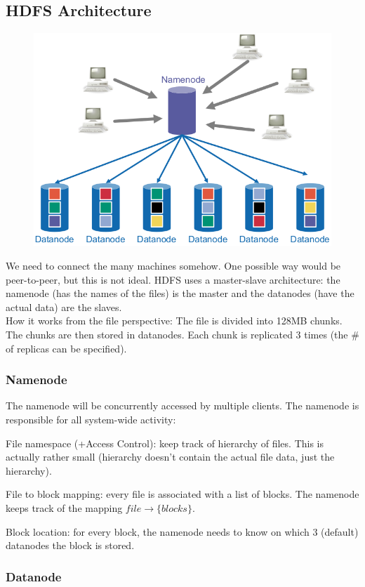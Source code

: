 \documentclass[11pt,oneside,a4paper]{article}
\begin{document}
\subsection{HDFS Architecture}

\begin{figure}[hb!]
	\centering
	\includegraphics[width=0.3\linewidth]{figures/hdfs_architecture}
	\label{fig:hdfsarchitecture}
\end{figure}


We need to connect the many machines somehow. One possible way would be peer-to-peer, but this is not ideal. HDFS uses a master-slave architecture: the namenode (has the names of the files) is the master and the datanodes (have the actual data) are the slaves.\\
How it works from the file perspective: The file is divided into 128MB chunks. The chunks are then stored in datanodes. Each chunk is replicated 3 times (the \# of replicas can be specified).

\subsubsection{Namenode}

The namenode will be concurrently accessed by multiple clients. The namenode is responsible for all system-wide activity:

\begin{compactitem}
	\item File namespace (+Access Control): keep track of hierarchy of files. This is actually rather small (hierarchy doesn't contain the actual file data, just the hierarchy).
	\item File to block mapping: every file is associated with a list of blocks. The namenode keeps track of the mapping $file \rightarrow \{blocks\}$.
	\item Block location: for every block, the namenode needs to know on which 3 (default) datanodes the block is stored.
\end{compactitem}

\subsubsection{Datanode}
\end{document}
